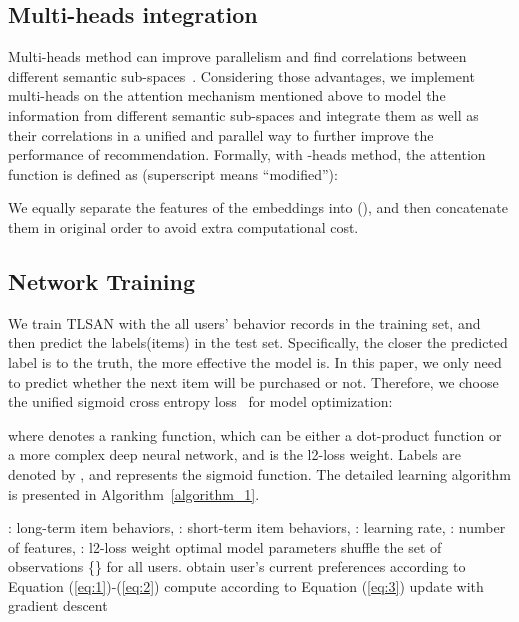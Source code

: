 \documentclass[preprint,12pt]{elsarticle}
\newcommand{\tool}{TLSAN\xspace}
\begin{document}
\begin{sloppypar}
\subsection{Multi-heads integration}

Multi-heads method can improve parallelism and find correlations between different semantic sub-spaces~\cite{zheng2017joint, huang2018csan, zhou2018atrank, cao2020position}. Considering those advantages, we implement multi-heads on the attention mechanism mentioned above to model the information from different semantic sub-spaces and integrate them as well as their correlations in a unified and parallel way to further improve the performance of recommendation. Formally, with -heads method, the attention function is defined as (superscript  means ``modified''):


We equally separate the features of the embeddings into  (), and then concatenate them in original order to avoid extra computational cost.

\subsection{Network Training}

We train \tool with the all users' behavior records in the training set, and then predict the labels(items) in the test set. Specifically, the closer the predicted label is to the truth, the more effective the model is. In this paper, we only need to predict whether the next item will be purchased or not. Therefore, we choose the unified sigmoid cross entropy loss~\cite{zhou2018atrank} for model optimization:

where  denotes a ranking function, which can be either a dot-product function or a more complex deep neural network,  and  is the l2-loss weight. Labels are denoted by , and  represents the sigmoid function. The detailed learning algorithm is presented in Algorithm~\ref{algorithm_1}.

\begin{algorithm}[ht]
	\caption{Learning Algorithm of \tool}
	\begin{algorithmic}[1]
		\Require 
		: long-term item behaviors,
		: short-term item behaviors,
		: learning rate,
		: number of features,
		: l2-loss weight
		\Ensure 
		optimal model parameters  
		\Repeat 
		\State shuffle the set of observations \{\} for all users. 
		\State obtain user's current preferences  according to Equation (\ref{eq:1})-(\ref{eq:2})
		\State compute  according to Equation (\ref{eq:3})
		\State update  with gradient descent
		\EndFor
		 \\
		\Return 
	\end{algorithmic}
	\label{algorithm_1}
\end{algorithm}


\end{sloppypar}
\end{document}
